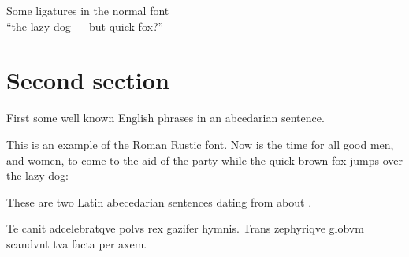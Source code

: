 \documentclass{article}
\newcommand{\Romannum}[1]{\uppercase\expandafter{\romannumeral #1}}
\newcommand{\Sentence}{%
This is an example of the Roman Rustic font. Now is the time for all good
men, and women, to come to the aid of the party while the quick brown fox
jumps over the lazy dog:}
\newcommand{\latin}{Te canit adcelebratqve polvs rex gazifer hymnis.
  Trans zephyriqve globvm scandvnt tva facta per axem.}
\begin{document}
\begin{center}
    Some ligatures in the normal font \\
{``the lazy dog --- but quick fox?''}
\end{center}

\section{Second section}

    First some well known English phrases in an abcedarian sentence.

\Sentence{}

    These are two Latin abecedarian sentences dating from about 
\Romannum{790}.

\latin{}

    
\end{document}

